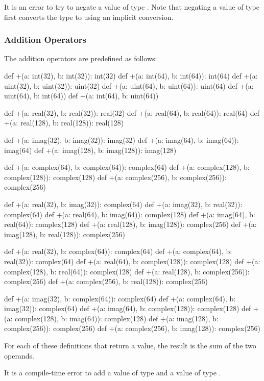 It is an error to try to negate a value of type .  Note
that negating a value of type  first converts the type
to  using an implicit conversion.

\subsubsection{Addition Operators}
\label{Addition_Operators}

The addition operators are predefined as follows:
\begin{chapel}
def +(a: int(32), b: int(32)): int(32)
def +(a: int(64), b: int(64)): int(64)
def +(a: uint(32), b: uint(32)): uint(32)
def +(a: uint(64), b: uint(64)): uint(64)
def +(a: uint(64), b: int(64))
def +(a: int(64), b: uint(64))

def +(a: real(32), b: real(32)): real(32)
def +(a: real(64), b: real(64)): real(64)
def +(a: real(128), b: real(128)): real(128)

def +(a: imag(32), b: imag(32)): imag(32)
def +(a: imag(64), b: imag(64)): imag(64)
def +(a: imag(128), b: imag(128)): imag(128)

def +(a: complex(64), b: complex(64)): complex(64)
def +(a: complex(128), b: complex(128)): complex(128)
def +(a: complex(256), b: complex(256)): complex(256)

def +(a: real(32), b: imag(32)): complex(64)
def +(a: imag(32), b: real(32)): complex(64)
def +(a: real(64), b: imag(64)): complex(128)
def +(a: imag(64), b: real(64)): complex(128)
def +(a: real(128), b: imag(128)): complex(256)
def +(a: imag(128), b: real(128)): complex(256)

def +(a: real(32), b: complex(64)): complex(64)
def +(a: complex(64), b: real(32)): complex(64)
def +(a: real(64), b: complex(128)): complex(128)
def +(a: complex(128), b: real(64)): complex(128)
def +(a: real(128), b: complex(256)): complex(256)
def +(a: complex(256), b: real(128)): complex(256)

def +(a: imag(32), b: complex(64)): complex(64)
def +(a: complex(64), b: imag(32)): complex(64)
def +(a: imag(64), b: complex(128)): complex(128)
def +(a: complex(128), b: imag(64)): complex(128)
def +(a: imag(128), b: complex(256)): complex(256)
def +(a: complex(256), b: imag(128)): complex(256)
\end{chapel}
For each of these definitions that return a value, the result is the
sum of the two operands.

It is a compile-time error to add a value of type  and
a value of type .

